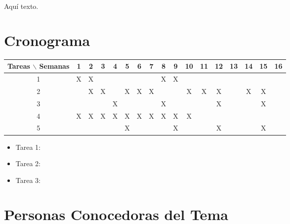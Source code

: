 \documentclass[12pt]{article}
\begin{document}



Aqu\'i texto.

\section{Cronograma}

\begin{table}[htb]
	\begin{tabular}{|c|cccccccccccccccc| }
	\hline
	Tareas $\backslash$ Semanas & 1 & 2 & 3 & 4 & 5 & 6 & 7 & 8 & 9 & 10 & 11 & 12 & 13 & 14 & 15 & 16  \\
	\hline
	1 & X & X &   &   &   &   &   & X & X &   &   &   &   &   &   &   \\
	2 &   & X & X &   & X & X & X &   &   & X & X & X &   & X & X &   \\
	3 &   &   &   & X &   &   &   & X &   &   &   & X &   &   & X &   \\
	4 & X & X & X & X & X & X & X & X & X & X &   &   &   &   &   &   \\
	5 &   &   &   &   & X &   &   &   & X &   &   & X &   &   & X &   \\
	\hline
	\end{tabular}
\end{table}
\vspace{1mm}

\begin{itemize}
	\item Tarea 1:
	\item Tarea 2: 
	\item Tarea 3:
\end{itemize}

\section{Personas Conocedoras del Tema}
\end{document}
